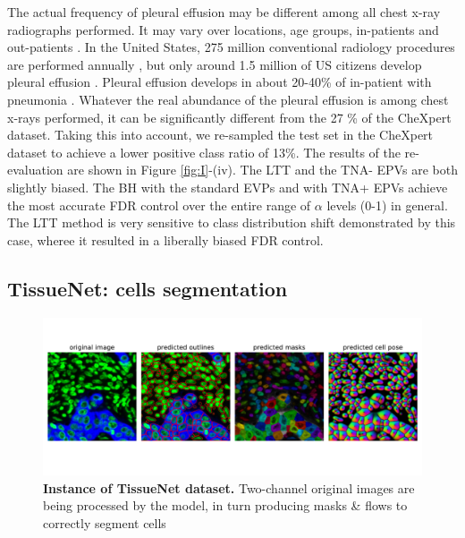 \documentclass{article}
\begin{document}
The actual frequency of pleural effusion may be different among all chest x-ray radiographs performed. It may vary over locations, age groups, in-patients and out-patients \cite{Zaki2024,Cashen2017PleuralEA}. In the United States, 275 million conventional radiology procedures are performed annually \cite{mahesh2022patient}, but only around 1.5 million of US citizens develop pleural effusion \cite{Cashen2017PleuralEA}. Pleural effusion develops in about 20-40\% of in-patient with pneumonia \cite{shebl2018parapneumonic}. Whatever the real abundance of the pleural effusion is among  chest x-rays performed, it can be significantly different from the 27 \% of the CheXpert dataset. Taking this into account, we re-sampled the test set in the CheXpert dataset to achieve a lower positive class ratio of 13\%. The results of the re-evaluation are shown in Figure \ref{fig:I}-(iv). The LTT and the TNA- EPVs are both slightly biased. The BH with the standard EVPs and with TNA+ EPVs achieve the most accurate FDR control over the entire range of $\alpha$ levels (0-1) in general. The LTT method is very sensitive to class distribution shift demonstrated by this case, wheree it resulted in a liberally biased FDR control.



\subsection{TissueNet: cells segmentation}

\begin{figure}[h!]
    \centering
	\includegraphics[width=5in]{img/tissuenet.pdf}
	\caption{{\bf Instance of TissueNet dataset.} Two-channel original images are being processed by the model, in turn producing masks \& flows to correctly segment cells}
	\label{fig:tissue_example}
\end{figure} 
\end{document}
